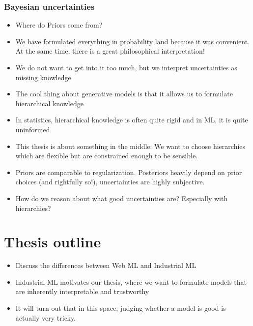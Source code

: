 \subsubsection{Bayesian uncertainties}
\begin{itemize}
    \item Where do Priors come from?
    \item We have formulated everything in probability land because it was convenient. At the same time, there is a great philosophical interpretation!
    \item We do not want to get into it too much, but we interpret uncertainties as missing knowledge
    \item The cool thing about generative models is that it allows us to formulate hierarchical knowledge
    \item In statistics, hierarchical knowledge is often quite rigid and in ML, it is quite uninformed
    \item This thesis is about something in the middle: We want to choose hierarchies which are flexible but are constrained enough to be sensible.
    \item Priors are comparable to regularization. Posteriors heavily depend on prior choices (and rightfully so!), uncertainties are highly subjective.
    \item How do we reason about what good uncertainties are? Especially with hierarchies?
\end{itemize}

\section{Thesis outline}

\begin{itemize}
    \item Discuss the differences between Web ML and Industrial ML
    \item Industrial ML motivates our thesis, where we want to formulate models that are inherently interpretable and trustworthy
    \item It will turn out that in this space, judging whether a model is good is actually very tricky.
\end{itemize}
